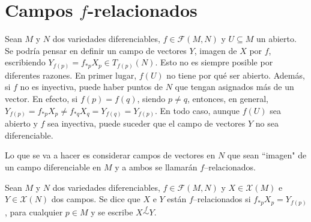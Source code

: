 \documentclass[cursovd_portada.tex]{subfiles}
\begin{document}
\section{Campos $f$-relacionados}
\hs Sean $M$ y $N$ dos variedades diferenciables, $f\in\mathcal{F}(M,N)$ y $U\subseteq M$ un abierto. Se podría
pensar en definir un campo de vectores $Y$, imagen de $X$ por $f$, escribiendo $Y_{f(p)}=f_{*p}X_p\in
T_{f(p)}(N)$. Esto no es siempre posible por diferentes razones. En primer lugar, $f(U)$ no tiene por qué ser
abierto. Además, si $f$ no es inyectiva, puede haber puntos de $N$ que tengan asignados más de un vector. En
efecto, si $f(p)=f(q)$, siendo $p\neq q$, entonces, en general, $Y_{f(p)}=f_{*p}X_p\neq
f_{*q}X_q=Y_{f(q)}=Y_{f(p)}$. En todo caso, aunque $f(U)$ sea abierto y $f$ sea inyectiva, puede suceder que el
campo de vectores $Y$ no sea diferenciable.
\par
Lo que se va a hacer es considerar campos de vectores en $N$ que sean ``imagen" de un campo diferenciable en $M$ y
a ambos se llamarán $f$--relacionados.
\begin{defi}
Sean $M$ y $N$ dos variedades diferenciables, $f\in\mathcal{F}(M,N)$ y $X\in\mathcal{X}(M)$ e $Y\in\mathcal{X}(N)$
dos campos. Se dice que $X$ e $Y$ están $f$--relacionados si $f_{*p}X_p=Y_{f(p)}$, para cualquier $p\in M$ y se
escribe $X\stackrel{f}\sim Y$.
\end{defi}

\newpage
\end{document}
